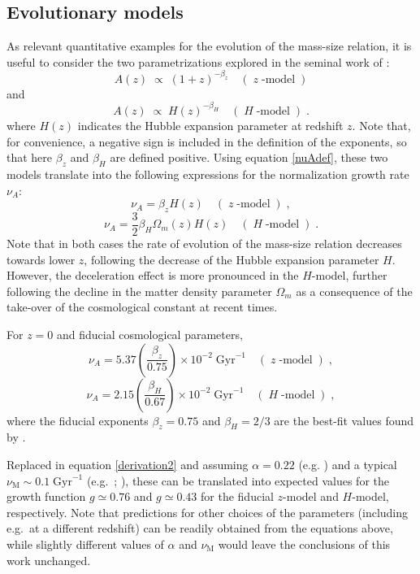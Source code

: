 \documentclass[fleqn,usenatbib]{mnras}
\begin{document}
\subsection{Evolutionary models}\label{subsec:predictions}
As relevant quantitative examples for the evolution of the mass-size relation, it is useful to consider the two parametrizations explored in the seminal work of \cite{vdW+14}:
\begin{equation}\label{zmodel}
A(z) \; \propto \; (1+z)^{-\beta_z} \quad(\;z\;\textrm{-model}\;)
\end{equation}
and
\begin{equation}\label{Hmodel}
 A(z) \; \propto \; H(z)^{-\beta_H} \quad (\;H\;\textrm{-model}\;) \;.
\end{equation} 
where $H(z)$ indicates the Hubble expansion parameter at redshift $z$. Note that, for convenience, a negative sign is included in the definition of the exponents, so that here $\beta_z$ and $\beta_H$ are defined positive. Using equation \eqref{nuAdef}, these two models translate into the following expressions for the normalization growth rate $\nu_A$:
\begin{equation}
\nu_A = \beta_z H (z) \quad (\;z\;\textrm{-model}\;) \;,
\end{equation}
\begin{equation}
\nu_A = \frac{3}{2} \beta_H \Omega_m(z) H(z) \quad (\;H\;\textrm{-model}\;) \;.
\end{equation}
Note that in both cases the rate of evolution of the mass-size relation decreases towards lower $z$, following the decrease of the Hubble expansion parameter $H$. However, the deceleration effect is more pronounced in the $H$-model, further following the decline in the matter density parameter $\Omega_m$ as a consequence of the take-over of the cosmological constant at recent times. 

For $z=0$ and fiducial cosmological parameters,
\begin{equation}
\nu_A = 5.37 \left( \frac{\beta_z}{0.75} \right) \times 10^{-2} \; \textrm{Gyr}^{-1} \quad (\;z\;\textrm{-model}\;)\;,
\end{equation}
\begin{equation}
\nu_A = 2.15 \left( \frac{\beta_H}{0.67} \right) \times 10^{-2} \; \textrm{Gyr}^{-1} \quad (\;H\;\textrm{-model}\;) \;,
\end{equation}
where the fiducial exponents $\beta_z = 0.75$ and $\beta_H = 2/3$ are the best-fit values found by \cite{vdW+14}.

Replaced in equation \eqref{derivation2} and assuming $\alpha = 0.22$ (e.g. \citealt{Lange+15}) and a typical $\nu_\textrm{M} \sim 0.1 \; \textrm{Gyr}^{-1}$ (e.g.\ \citealt{Speagle+14}; \citealt{McGaugh+17}), these can be translated into expected values for the growth function $g \simeq 0.76$ and $g \simeq 0.43$ for the fiducial $z$-model and $H$-model, respectively. Note that predictions for other choices of the parameters (including e.g.\ at a different redshift) can be readily obtained from the equations above, while slightly different values of $\alpha$ and $\nu_\textrm{M}$ would leave the conclusions of this work unchanged.
\end{document}
